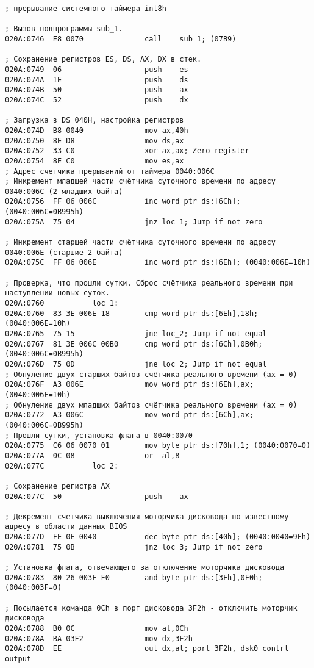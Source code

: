 \begin{lstlisting}[style = {asm}]
; прерывание системного таймера int8h

; Вызов подпрограммы sub_1.
020A:0746  E8 0070			    call	sub_1; (07B9)

; Сохранение регистров ES, DS, AX, DX в стек.
020A:0749  06					push	es
020A:074A  1E					push	ds
020A:074B  50					push	ax
020A:074C  52					push	dx

; Загрузка в DS 040H, настройка регистров
020A:074D  B8 0040				mov	ax,40h
020A:0750  8E D8				mov	ds,ax
020A:0752  33 C0				xor	ax,ax; Zero register
020A:0754  8E C0				mov	es,ax
; Адрес счетчика прерываний от таймера 0040:006C
; Инкремент младшей части счётчика суточного времени по адресу 0040:006C (2 младших байта)
020A:0756  FF 06 006C			inc	word ptr ds:[6Ch]; (0040:006C=0B995h)
020A:075A  75 04				jnz	loc_1; Jump if not zero

; Инкремент старшей части счётчика суточного времени по адресу 0040:006E (старшие 2 байта)
020A:075C  FF 06 006E			inc	word ptr ds:[6Eh]; (0040:006E=10h)

; Проверка, что прошли сутки. Сброс счётчика реального времени при наступлении новых суток.
020A:0760			loc_1:
020A:0760  83 3E 006E 18		cmp	word ptr ds:[6Eh],18h; (0040:006E=10h)
020A:0765  75 15				jne	loc_2; Jump if not equal
020A:0767  81 3E 006C 00B0		cmp	word ptr ds:[6Ch],0B0h; (0040:006C=0B995h)
020A:076D  75 0D				jne	loc_2; Jump if not equal
; Обнуление двух старших байтов счётчика реального времени (ax = 0)
020A:076F  A3 006E				mov	word ptr ds:[6Eh],ax; (0040:006E=10h)
; Обнуление двух младших байтов счётчика реального времени (ax = 0)
020A:0772  A3 006C				mov	word ptr ds:[6Ch],ax; (0040:006C=0B995h)
; Прошли сутки, установка флага в 0040:0070
020A:0775  C6 06 0070 01		mov	byte ptr ds:[70h],1; (0040:0070=0)
020A:077A  0C 08				or	al,8
020A:077C			loc_2:

; Сохранение регистра AX
020A:077C  50					push	ax

; Декремент счетчика выключения моторчика дисковода по известному адресу в области данных BIOS
020A:077D  FE 0E 0040			dec	byte ptr ds:[40h]; (0040:0040=9Fh)
020A:0781  75 0B				jnz	loc_3; Jump if not zero

; Установка флага, отвечающего за отключение моторчика дисковода
020A:0783  80 26 003F F0		and	byte ptr ds:[3Fh],0F0h; (0040:003F=0)

; Посылается команда 0Ch в порт дисковода 3F2h - отключить моторчик дисковода
020A:0788  B0 0C				mov	al,0Ch
020A:078A  BA 03F2				mov	dx,3F2h
020A:078D  EE					out	dx,al; port 3F2h, dsk0 contrl output


\end{lstlisting}
